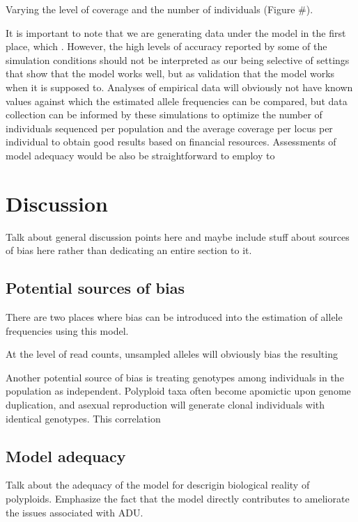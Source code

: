 \documentclass[11pt,english,letterpaper,oneside]{article}
\begin{document}
Varying the level of coverage and the number of individuals (Figure \#).
\medskip

It is important to note that we are generating data under the model in the first place, which . However, the high levels of accuracy reported by some of the simulation conditions should not be interpreted as our being selective of settings that show that the model works well, but as validation that the model works when it is supposed to. Analyses of empirical data will obviously not have known values against which the estimated allele frequencies can be compared, but data collection can be informed by these simulations to optimize the number of individuals sequenced per population and the average coverage per locus per individual to obtain good results based on financial resources. Assessments of model adequacy would be also be straightforward to employ to 
\medskip

\section*{Discussion}               %

Talk about general discussion points here and maybe include stuff about sources of bias here rather than dedicating an entire section to it.

\medskip
\subsection*{Potential sources of bias}
\medskip

There are two places where bias can be introduced into the estimation of allele frequencies using this model.
\medskip

At the level of read counts, unsampled alleles will obviously bias the resulting
\medskip

Another potential source of bias is treating genotypes among individuals in the population as independent. Polyploid taxa often become apomictic upon genome duplication, and asexual reproduction will generate clonal individuals with identical genotypes. This correlation 

\medskip
\subsection*{Model adequacy}
\medskip

Talk about the adequacy of the model for descrigin biological reality of polyploids. Emphasize the fact that the model directly contributes to ameliorate the issues associated with ADU.
\end{document}

